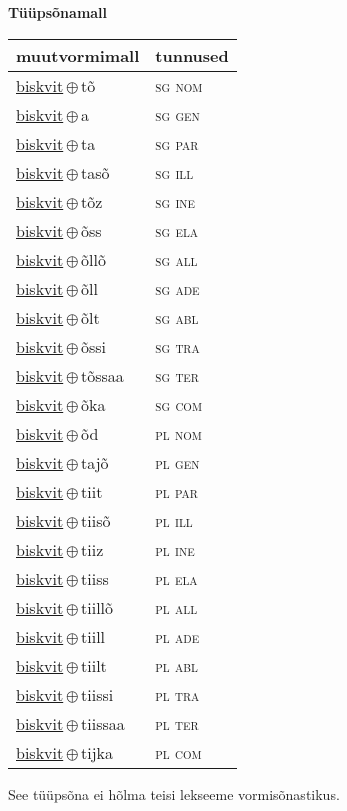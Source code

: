 

\vspace{3.5em}
\noindent \begin{minipage}{\textwidth}
\noindent \textbf{Tüüpsõnamall \,}\\

\begin{sideways}
\begin{tabular}{l l}
muutvormimall & tunnused \\
\hline
\underline{biskvit}\,$\oplus$\,tõ & \textsc{ sg nom } \\
\underline{biskvit}\,$\oplus$\,a & \textsc{ sg gen } \\
\underline{biskvit}\,$\oplus$\,ta & \textsc{ sg par } \\
\underline{biskvit}\,$\oplus$\,tasõ & \textsc{ sg ill } \\
\underline{biskvit}\,$\oplus$\,tõz & \textsc{ sg ine } \\
\underline{biskvit}\,$\oplus$\,õss & \textsc{ sg ela } \\
\underline{biskvit}\,$\oplus$\,õllõ & \textsc{ sg all } \\
\underline{biskvit}\,$\oplus$\,õll & \textsc{ sg ade } \\
\underline{biskvit}\,$\oplus$\,õlt & \textsc{ sg abl } \\
\underline{biskvit}\,$\oplus$\,õssi & \textsc{ sg tra } \\
\underline{biskvit}\,$\oplus$\,tõssaa & \textsc{ sg ter } \\
\underline{biskvit}\,$\oplus$\,õka & \textsc{ sg com } \\
\underline{biskvit}\,$\oplus$\,õd & \textsc{ pl nom } \\
\underline{biskvit}\,$\oplus$\,tajõ & \textsc{ pl gen } \\
\underline{biskvit}\,$\oplus$\,tiit & \textsc{ pl par } \\
\underline{biskvit}\,$\oplus$\,tiisõ & \textsc{ pl ill } \\
\underline{biskvit}\,$\oplus$\,tiiz & \textsc{ pl ine } \\
\underline{biskvit}\,$\oplus$\,tiiss & \textsc{ pl ela } \\
\underline{biskvit}\,$\oplus$\,tiillõ & \textsc{ pl all } \\
\underline{biskvit}\,$\oplus$\,tiill & \textsc{ pl ade } \\
\underline{biskvit}\,$\oplus$\,tiilt & \textsc{ pl abl } \\
\underline{biskvit}\,$\oplus$\,tiissi & \textsc{ pl tra } \\
\underline{biskvit}\,$\oplus$\,tiissaa & \textsc{ pl ter } \\
\underline{biskvit}\,$\oplus$\,tijka & \textsc{ pl com } \\
\end{tabular}
\end{sideways}
\label{tab:tüüpsõnamall-biskvittõ}

\end{minipage}

 
\vspace{1em}
\noindent See tüüpsõna ei hõlma teisi lekseeme vormi\-sõnastikus.

